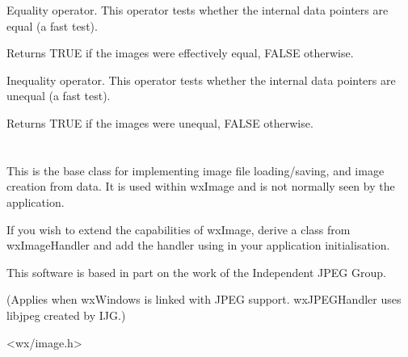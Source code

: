 

Equality operator. This operator tests whether the internal data pointers are
equal (a fast test).




Returns TRUE if the images were effectively equal, FALSE otherwise.



Inequality operator. This operator tests whether the internal data pointers are
unequal (a fast test).




Returns TRUE if the images were unequal, FALSE otherwise.

\section{}\label{wximagehandler}

This is the base class for implementing image file loading/saving, and image creation from data.
It is used within wxImage and is not normally seen by the application.

If you wish to extend the capabilities of wxImage, derive a class from wxImageHandler
and add the handler using  in your
application initialisation.


This software is based in part on the work of the Independent JPEG Group.

(Applies when wxWindows is linked with JPEG support. wxJPEGHandler uses libjpeg
created by IJG.)




<wx/image.h>



